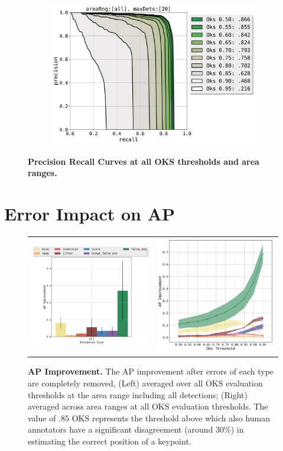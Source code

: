 \documentclass[10pt,onecolumn,letterpaper]{article}
\begin{document}
\begin{figure}[h!]
\begin{subfigure}{.4\linewidth}
\label{fig:sub2}
\end{subfigure}\\[1ex]
\begin{subfigure}{\linewidth}
\centering
\includegraphics[width=.4\linewidth]{./result/rmpe/prc_[rmpe][all][20].pdf}
\label{fig:sub3}
\end{subfigure}
\vspace{-3mm}
\caption{ {\small \textbf{Precision Recall Curves at all OKS thresholds and area ranges.} }}
\label{fig:test}
\end{figure}

\vspace{-5mm}
\section{Error Impact on AP}
\vspace{-3mm}
\begin{figure}[h!]
\centering
\begin{tabular}{cc}
\includegraphics[width=.35\linewidth]{./result/rmpe/AP_improvement/ap_improv_areas_all.pdf} &
\includegraphics[width=.3\linewidth]{./result/rmpe/AP_improvement/ap_improv_oks.pdf}\\
\end{tabular}
\caption{ {\small \textbf{AP Improvement.} The AP improvement after errors of each type are completely removed,
(Left) averaged over all OKS evaluation thresholds at the area range including all detections;
(Right) averaged across area ranges at all OKS evaluation thresholds.
The value of .85 OKS represents the threshold above which also human annotators have a significant disagreement (around 30\%) in estimating the correct position of a keypoint.}}
\end{figure}
\end{document}
